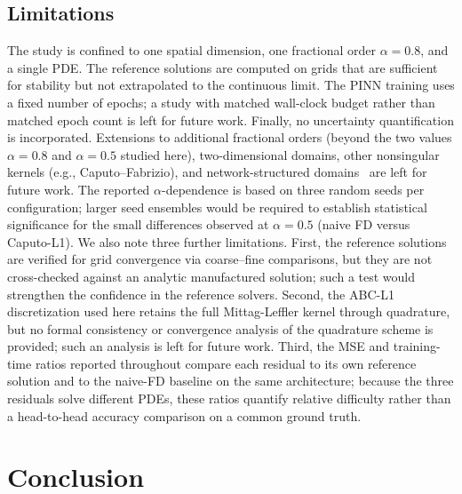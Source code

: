 \documentclass[11pt]{article}
\begin{document}
\subsection{Limitations}
\label{sec:limitations}

The study is confined to one spatial dimension, one fractional order \(\alpha=0.8\), and a single PDE. The reference solutions are computed on grids that are sufficient for stability but not extrapolated to the continuous limit. The PINN training uses a fixed number of epochs; a study with matched wall-clock budget rather than matched epoch count is left for future work. Finally, no uncertainty quantification is incorporated. Extensions to additional fractional orders (beyond the two
values \(\alpha=0.8\) and \(\alpha=0.5\) studied here), two-dimensional domains, other nonsingular
kernels (e.g., Caputo--Fabrizio), and network-structured domains~\cite{Mehandiratta2025} are left for future work. The reported
\(\alpha\)-dependence is based on three random seeds per configuration;
larger seed ensembles would be required to establish statistical
significance for the small differences observed at \(\alpha=0.5\) (naive FD versus Caputo-L1). We also note three further limitations. First, the reference solutions are verified for grid convergence via coarse--fine comparisons, but they are not cross-checked against an analytic manufactured solution; such a test would strengthen the confidence in the reference solvers. Second, the ABC-L1 discretization used here retains the full Mittag-Leffler kernel through quadrature, but no formal consistency or convergence analysis of the quadrature scheme is provided; such an analysis is left for future work. Third, the MSE and training-time ratios reported throughout compare each residual to its own reference solution and to the naive-FD baseline on the same architecture; because the three residuals solve different PDEs, these ratios quantify relative difficulty rather than a head-to-head accuracy comparison on a common ground truth.

\section{Conclusion}
\label{sec:conclusion}
\end{document}
